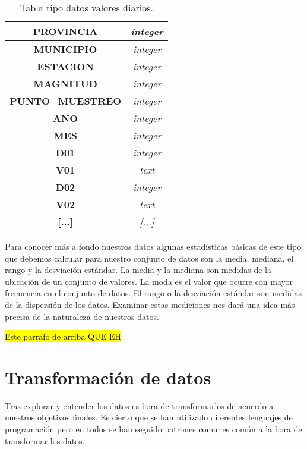 \begin{table}[H]
	\begin{center}
		\begin{tabular}{|c|c|}
			\hline
			\textbf{PROVINCIA}       & \textit{integer}              \\ \hline
			\textbf{MUNICIPIO}       & \textit{integer}              \\ \hline
			\textbf{ESTACION}        & \textit{integer}               \\ \hline
			\textbf{MAGNITUD}        & \textit{integer}               \\ \hline
			\textbf{PUNTO\_MUESTREO} & \textit{integer} \\ \hline
			\textbf{ANO}             & \textit{integer}            \\ \hline
			\textbf{MES}             & \textit{integer}               \\ \hline
			\textbf{D01}             & \textit{integer}              \\ \hline
			\textbf{V01}             & \textit{text}               \\ \hline
			\textbf{D02}             & \textit{integer}              \\ \hline
			\textbf{V02}             & \textit{text}               \\ \hline
			\textbf{[...]}             & \textit{[...]}               \\ \hline
		\end{tabular}
		\caption{Tabla tipo datos valores diarios.}
	\end{center}
\end{table}

Para conocer más a fondo nuestros datos algunas estadísticas básicas de este tipo que debemos calcular para nuestro conjunto de datos son la media, mediana, el rango y la desviación estándar. La media y la mediana son medidas de la ubicación de un conjunto de valores. La moda es el valor que ocurre con mayor frecuencia en el conjunto de datos. El rango o la desviación estándar son medidas de la dispersión de los datos. Examinar estas mediciones nos dará una idea más precisa de la naturaleza de nuestros datos.

 \hl{Este parrafo de arriba QUE EH}
 


\section{Transformación de datos}
Tras explorar y entender los datos es hora de transformarlos de acuerdo a nuestros objetivos finales. Es cierto que se han utilizado diferentes lenguajes de programación pero en todos se han seguido patrones comunes común a la hora de transformar los datos.

